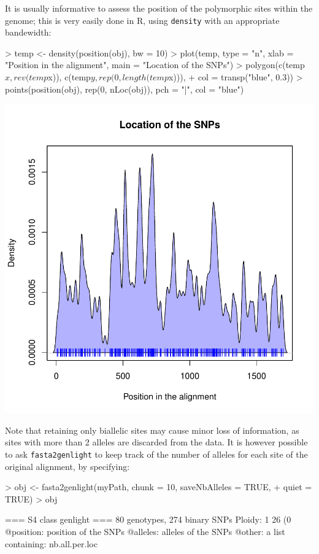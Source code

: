 \documentclass{article}
\begin{document}
\noindent It is usually informative to assess the position of the polymorphic sites within the
genome; this is very easily done in R, using \texttt{density} with an appropriate bandewidth:
\begin{Schunk}
\begin{Sinput}
> temp <- density(position(obj), bw = 10)
> plot(temp, type = "n", xlab = "Position in the alignment", main = "Location of the SNPs")
> polygon(c(temp$x, rev(temp$x)), c(temp$y, rep(0, length(temp$x))), 
+     col = transp("blue", 0.3))
> points(position(obj), rep(0, nLoc(obj)), pch = "|", col = "blue")
\end{Sinput}
\end{Schunk}
\includegraphics{figs/genomics-027}

\noindent Note that retaining only biallelic sites may cause minor loss of information, as sites
with more than 2 alleles are discarded from the data.
It is however possible to ask \texttt{fasta2genlight} to keep track of the number of alleles for
each site of the original alignment, by specifying:
\begin{Schunk}
\begin{Sinput}
> obj <- fasta2genlight(myPath, chunk = 10, saveNbAlleles = TRUE, 
+     quiet = TRUE)
> obj
\end{Sinput}
\begin{Soutput}
 === S4 class genlight ===
 80 genotypes,  274 binary SNPs
 Ploidy: 1
 26 (0 %
 @position: position of the SNPs
 @alleles: alleles of the SNPs
 @other: a list containing: nb.all.per.loc 
\end{Soutput}
\end{Schunk}
\end{document}
